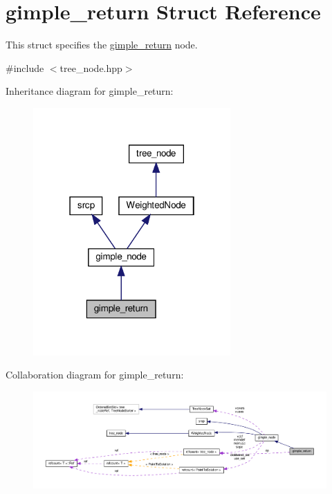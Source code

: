 \hypertarget{structgimple__return}{}\section{gimple\+\_\+return Struct Reference}
\label{structgimple__return}


This struct specifies the \hyperlink{structgimple__return}{gimple\+\_\+return} node.  




{\ttfamily \#include $<$tree\+\_\+node.\+hpp$>$}



Inheritance diagram for gimple\+\_\+return\+:
\nopagebreak
\begin{figure}[H]
\begin{center}
\leavevmode
\includegraphics[width=214pt]{d1/d61/structgimple__return__inherit__graph}
\end{center}
\end{figure}


Collaboration diagram for gimple\+\_\+return\+:
\nopagebreak
\begin{figure}[H]
\begin{center}
\leavevmode
\includegraphics[width=350pt]{d0/d92/structgimple__return__coll__graph}
\end{center}
\end{figure}
